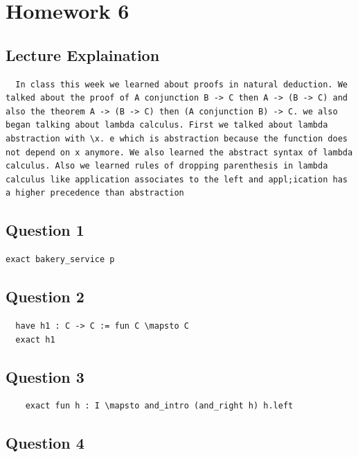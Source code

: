 \documentclass{article}
\theoremstyle{plain}
\theoremstyle{definition}
\theoremstyle{remark}
\begin{document}
\section{Homework 6}\label{homework6}

\subsection{Lecture Explaination}

\begin{lstlisting}
  In class this week we learned about proofs in natural deduction. We talked about the proof of A conjunction B -> C then A -> (B -> C) and also the theorem A -> (B -> C) then (A conjunction B) -> C. we also began talking about lambda calculus. First we talked about lambda abstraction with \x. e which is abstraction because the function does not depend on x anymore. We also learned the abstract syntax of lambda calculus. Also we learned rules of dropping parenthesis in lambda calculus like application associates to the left and appl;ication has a higher precedence than abstraction
\end{lstlisting}

\subsection{Question 1}

\begin{lstlisting}
exact bakery_service p
\end{lstlisting}

\subsection{Question 2}

\begin{lstlisting}
  have h1 : C -> C := fun C \mapsto C
  exact h1
  \end{lstlisting}
  
  \subsection{Question 3}
  
  \begin{lstlisting}
    exact fun h : I \mapsto and_intro (and_right h) h.left
    \end{lstlisting}


\subsection{Question 4}
\end{document}
